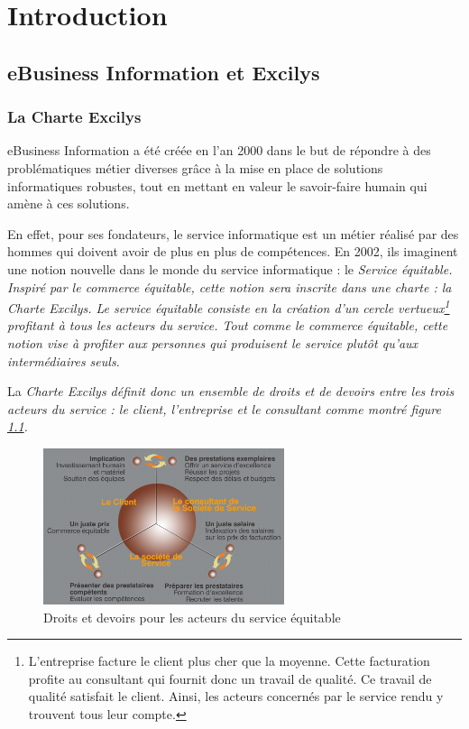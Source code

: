 \chapter{Introduction}
\section{eBusiness Information et Excilys}

\subsection{La Charte Excilys}
eBusiness Information a été créée en l'an 2000 dans le but de répondre à des problématiques métier diverses grâce à la mise en place de solutions informatiques robustes, tout en mettant en valeur le savoir-faire humain qui amène à ces solutions.

En effet, pour ses fondateurs, le service informatique est un métier réalisé par des hommes qui doivent avoir de plus en plus de compétences. En 2002, ils imaginent une notion nouvelle dans le monde du service informatique : le \em{Service équitable}\cite{www_excilys}. Inspiré par le commerce équitable, cette notion sera inscrite dans une charte : la \em{Charte Excilys}. Le service équitable consiste en la création d'un cercle vertueux\footnote{L'entreprise facture le client plus cher que la moyenne. Cette facturation profite au consultant qui fournit donc un travail de qualité. Ce travail de qualité satisfait le client. Ainsi, les acteurs concernés par le service rendu y trouvent tous leur compte.} profitant à tous les acteurs du service. Tout comme le commerce équitable, cette notion vise à profiter aux personnes qui produisent le service plutôt qu'aux intermédiaires seuls.

La \em{Charte Excilys} définit donc un ensemble de droits et de devoirs entre les trois acteurs du service : le client, l'entreprise et le consultant comme montré figure \ref{droits_devoirs}.

\begin{figure}[h]
\begin{center}
\includegraphics[width=200pt]{img/droits_devoirs.jpg}
\end{center}
\caption{Droits et devoirs pour les acteurs du service équitable}
\label{droits_devoirs}
\end{figure}


